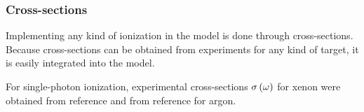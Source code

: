 %
%
%



\subsubsection{Cross-sections}
\label{section:intro:md:cross-sections}

Implementing any kind of ionization in the model is done through cross-sections.
Because cross-sections can be obtained from experiments for any kind of target,
it is easily integrated into the model.


For single-photon ionization, experimental cross-sections $\sigma\left( \omega \right)$
for xenon were obtained from reference \cite{West1978} and from
reference \cite{Marr1976} for argon.

